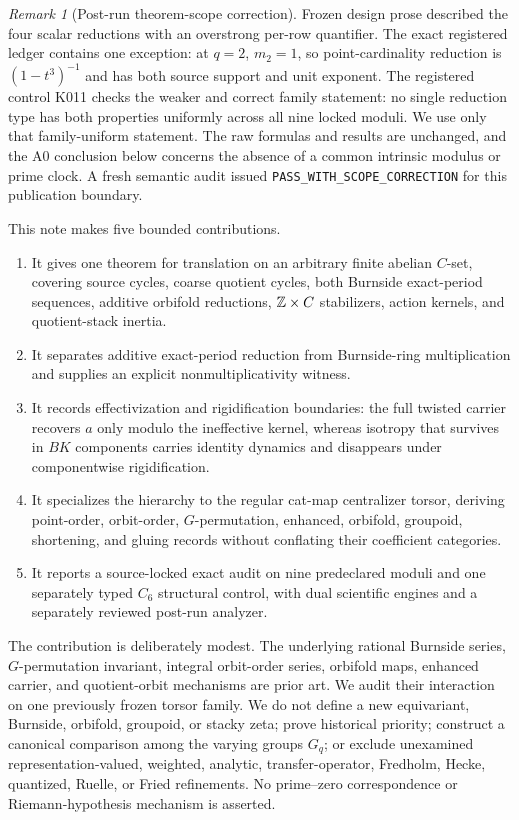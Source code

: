\documentclass[11pt]{article}
\theoremstyle{definition}
\theoremstyle{remark}
\newtheorem{remark}[theorem]{Remark}
\begin{document}
\begin{remark}[Post-run theorem-scope correction]
\label{rem:scope-correction}
Frozen design prose described the four scalar reductions with an overstrong
per-row quantifier.  The exact registered ledger contains one exception:
at \(q=2\), \(m_2=1\), so point-cardinality reduction is
\((1-t^3)^{-1}\) and has both source support and unit exponent.  The
registered control K011 checks the weaker and correct family statement: no
single reduction type has both properties uniformly across all nine locked
moduli.  We use only that family-uniform statement.  The raw formulas and
results are unchanged, and the A0 conclusion below concerns the absence of a
common intrinsic modulus or prime clock.  A fresh semantic audit issued
\texttt{PASS\_WITH\_SCOPE\_CORRECTION} for this publication boundary.
\end{remark}

This note makes five bounded contributions.
\begin{enumerate}
  \item It gives one theorem for translation on an arbitrary finite abelian
        \(C\)-set, covering source cycles, coarse quotient cycles, both
        Burnside exact-period sequences, additive orbifold reductions,
        \(\mathbb{Z}\times C\) stabilizers, action kernels, and quotient-stack
        inertia.
  \item It separates additive exact-period reduction from Burnside-ring
        multiplication and supplies an explicit nonmultiplicativity witness.
  \item It records effectivization and rigidification boundaries: the full
        twisted carrier recovers \(a\) only modulo the ineffective kernel,
        whereas isotropy that survives in \(BK\) components carries identity
        dynamics and disappears under componentwise rigidification.
  \item It specializes the hierarchy to the regular cat-map centralizer
        torsor, deriving point-order, orbit-order, \(G\)-permutation,
        enhanced, orbifold, groupoid, shortening, and gluing records without
        conflating their coefficient categories.
  \item It reports a source-locked exact audit on nine predeclared moduli and
        one separately typed \(C_6\) structural control, with dual scientific
        engines and a separately reviewed post-run analyzer.
\end{enumerate}

The contribution is deliberately modest.  The underlying rational
Burnside series, \(G\)-permutation invariant, integral orbit-order series,
orbifold maps, enhanced carrier, and quotient-orbit mechanisms are prior
art.  We audit their interaction on one previously frozen torsor family.  We
do not define a new equivariant, Burnside, orbifold, groupoid, or stacky zeta;
prove historical priority; construct a canonical comparison among the
varying groups \(G_q\); or exclude unexamined representation-valued,
weighted, analytic, transfer-operator, Fredholm, Hecke, quantized, Ruelle,
or Fried refinements.  No prime--zero correspondence or
Riemann-hypothesis mechanism is asserted.
\end{document}
